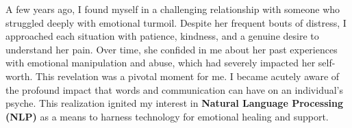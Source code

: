 \documentclass{article}
\newcommand{\school}{Stanford\xspace}
\begin{document}
A few years ago, I found myself in a challenging relationship with someone who struggled deeply with emotional turmoil. Despite her frequent bouts of distress, I approached each situation with patience, kindness, and a genuine desire to understand her pain. Over time, she confided in me about her past experiences with emotional manipulation and abuse, which had severely impacted her self-worth. This revelation was a pivotal moment for me. I became acutely aware of the profound impact that words and communication can have on an individual's psyche. This realization ignited my interest in \textbf{Natural Language Processing (NLP)} as a means to harness technology for emotional healing and support.
\\

\end{document}
